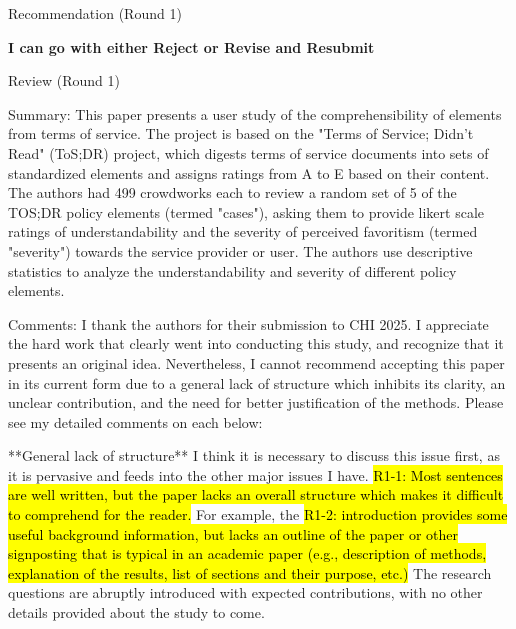 Recommendation (Round 1)

\textbf{I can go with either Reject or Revise and Resubmit}

Review (Round 1)

Summary:
This paper presents a user study of the comprehensibility of elements from terms
of service. The project is based on the "Terms of Service; Didn't
Read" (ToS;DR) project, which digests terms of service documents into
sets of standardized elements and assigns ratings from A to E based on
their content. The authors had  499 crowdworks each to review a random
set of 5 of the TOS;DR policy elements (termed "cases"), asking them
to provide likert scale ratings of understandability and the severity
of perceived favoritism (termed "severity") towards the service
provider or user. The authors use descriptive statistics to analyze
the understandability and severity of different policy elements.

Comments:
I thank the authors for their submission to CHI 2025. I appreciate the hard work
that clearly went into conducting this study, and recognize that it
presents an original idea. Nevertheless, I cannot recommend accepting
this paper in its current form due to a general lack of structure
which inhibits its clarity,  an unclear contribution, and the need for
better justification of the methods. Please see my detailed comments
on each below:

**General lack of structure**
I think it is necessary to discuss this issue first, as it is pervasive and feeds
into the other major issues I have. 
\hl{R1-1: Most sentences are well written,
but the paper lacks an overall structure which makes it difficult to
comprehend for the reader.}
For example, the 
\hl{R1-2: introduction provides some
useful background information, but lacks an outline of the paper or
other signposting that is typical in an academic paper (e.g.,
description of methods, explanation of the results, list of sections
and their purpose, etc.)
}
The research questions are abruptly
introduced with expected contributions, with no other details provided
about the study to come.

